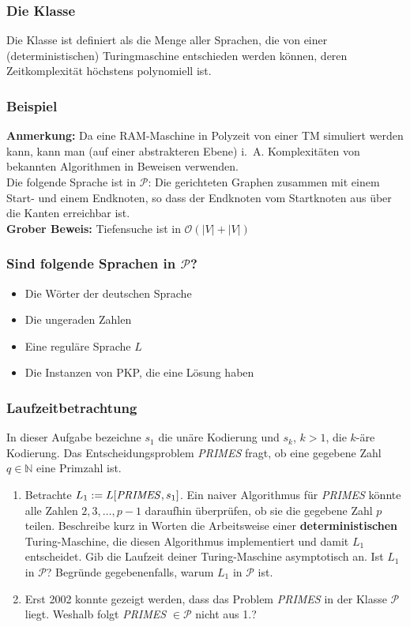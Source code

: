 \begin{frame}
\frametitle{Die Klasse \classP}
Die Klasse \classP{} ist definiert als die Menge aller Sprachen, die von einer (deterministischen) Turingmaschine entschieden werden können, deren Zeitkomplexität höchstens polynomiell ist.
\end{frame}

\begin{frame}
\frametitle{Beispiel}
\textbf{Anmerkung:} Da eine RAM-Maschine in Polyzeit von einer TM simuliert werden kann, kann man (auf einer abstrakteren Ebene) i.~A. Komplexitäten von bekannten Algorithmen in Beweisen verwenden.\\[10pt]
Die folgende Sprache ist in $\mathcal{P}$: Die gerichteten Graphen zusammen mit einem Start- und einem Endknoten, so dass der Endknoten vom Startknoten aus über die Kanten erreichbar ist.\\[6pt]
\textbf{Grober Beweis:}	Tiefensuche ist in $\mathcal{O}(|V| + |V|)$
\end{frame}

\begin{frame}
\frametitle{Sind folgende Sprachen in $\mathcal{P}$?}
\begin{itemize}
\item Die Wörter der deutschen Sprache
\item Die ungeraden Zahlen
\item Eine reguläre Sprache $L$
\item Die Instanzen von PKP, die eine Lösung haben
\end{itemize}
\end{frame}

\begin{frame}
 \frametitle{Laufzeitbetrachtung}
 In dieser Aufgabe bezeichne $s_1$ die un\"are Kodierung und $s_k$, $k >1$, die $k$-\"are Kodierung.
Das Entscheidungsproblem \textit{PRIMES} fragt, ob eine gegebene Zahl $q \in \mathbb N$ eine Primzahl ist.

\begin{enumerate}
\item Betrachte $L_1 := L[\text{\textit{PRIMES}},s_1]$. Ein naiver Algorithmus f\"ur \textit{PRIMES} k\"onnte alle Zahlen $2,3,\ldots,p-1$ daraufhin \"uberpr\"ufen, ob sie die gegebene Zahl $p$ teilen. Beschreibe kurz in Worten die Arbeitsweise einer \textbf{deterministischen} Turing-Maschine, die diesen Algorithmus implementiert und damit $L_1$ entscheidet. Gib die Laufzeit deiner Turing-Maschine asymptotisch an. Ist $L_1$ in $\mathcal P$? Begr\"unde gegebenenfalls, warum $L_1$ in $\mathcal P$ ist.
\item Erst 2002 konnte gezeigt werden, dass das Problem \textit{PRIMES} in der Klasse $\mathcal P$ liegt. Weshalb folgt \textit{PRIMES} $\in \mathcal P$ nicht aus 1.?
\end{enumerate}
\end{frame}

